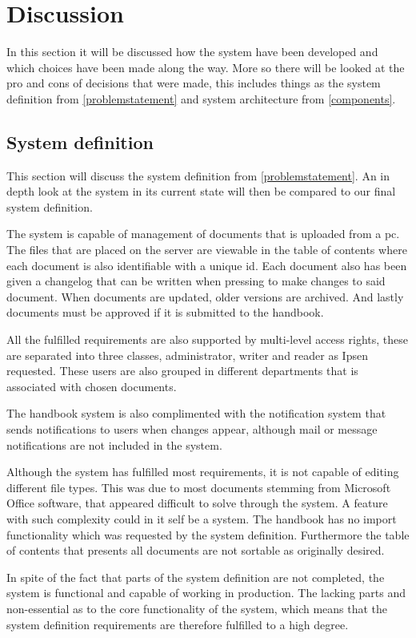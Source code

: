 \chapter{Discussion}
In this section it will be discussed how the system have been developed and which choices have been made along the way.
More so there will be looked at the pro and cons of decisions that were made, this includes things as the system definition from \cref{problemstatement} and system architecture from \cref{components}.

\section{System definition}
This section will discuss the system definition from \cref{problemstatement}.
An in depth look at the system in its current state will then be compared to our final system definition.

The system is capable of management of documents that is uploaded from a pc.
The files that are placed on the server are viewable in the table of contents where each document is also identifiable with a unique id.
Each document also has been given a changelog that can be written when pressing to make changes to said document.
When documents are updated, older versions are archived.
And lastly documents must be approved if it is submitted to the handbook.

All the fulfilled requirements are also supported by multi-level access rights, these are separated into three classes, administrator, writer and reader as Ipsen requested.
These users are also grouped in different departments that is associated with chosen documents.

The handbook system is also complimented with the notification system that sends notifications to users when changes appear, although mail or message notifications are not included in the system.

Although the system has fulfilled most requirements, it is not capable of editing different file types.
This was due to most documents stemming from Microsoft Office software, that appeared difficult to solve through the system.
A feature with such complexity could in it self be a system.
The handbook has no import functionality which was requested by the system definition.
Furthermore the table of contents that presents all documents are not sortable as originally desired.

In spite of the fact that parts of the system definition are not completed, the system is functional and capable of working in production.
The lacking parts and non-essential as to the core functionality of the system, which means that the system definition requirements are therefore fulfilled to a high degree.

